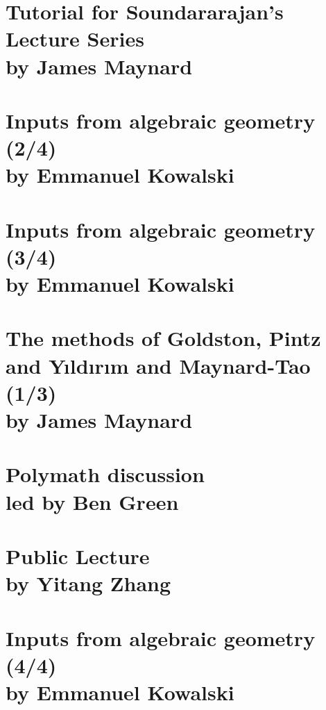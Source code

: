 \documentclass[12pt,amsfont]{amsart}
\begin{document}
\newpage
\renewcommand{\thesubsection}{\arabic{section}.\arabic{subsection}}
\section{Tutorial for Soundararajan's Lecture Series\\ by James Maynard}\label{12}



\newpage
\renewcommand{\thesubsection}{\arabic{section}.\arabic{subsection}}
\section{Inputs from algebraic geometry (2/4)\\ by Emmanuel Kowalski}\label{13}

\newpage
\renewcommand{\thesubsection}{\arabic{section}.\arabic{subsection}}
\section{Inputs from algebraic geometry (3/4)\\ by Emmanuel Kowalski}\label{14}

\newpage
\renewcommand{\thesubsection}{\arabic{section}.\arabic{subsection}}
\section{The methods of Goldston, Pintz and Y{\i}ld{\i}r{\i}m and Maynard-Tao (1/3)\\by James Maynard}\label{15}

\newpage
\renewcommand{\thesubsection}{\arabic{section}.\arabic{subsection}}
\section{Polymath discussion \\led by Ben Green}\label{16}

\newpage
\renewcommand{\thesubsection}{\arabic{section}.\arabic{subsection}}
\section{Public Lecture \\by Yitang Zhang}\label{17}

\newpage
\renewcommand{\thesubsection}{\arabic{section}.\arabic{subsection}}
\section{Inputs from algebraic geometry (4/4)\\ by Emmanuel Kowalski}\label{18}
\end{document}

